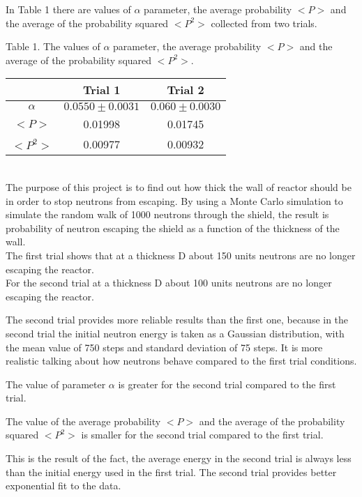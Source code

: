 \documentclass[12pt]{article}
\begin{document}
In Table 1 there are values of $\alpha$ parameter, the average probability $<P>$ and the average of the probability squared $<P^2>$ collected from two trials.


\begin{center}
Table 1. The values of $\alpha$ parameter, the average probability $<P>$ and the average of the probability squared $<P^2>$.

\begin{tabular}{|c|c|c|}
\hline
            & Trial 1 & Trial 2 \\
\hline
$\alpha$   & $0.0550 \pm 0.0031 $ &  $0.060 \pm 0.0030 $   \\
\hline
$<P>$   & 0.01998  &  0.01745   \\
\hline
$<P^2>$   & 0.00977   &  0.00932   \\
\hline
\end{tabular}\vskip 0.2in
\end{center}


\vskip0.1in
\\

The purpose of this project is to find out how thick the wall of reactor should be in order to stop neutrons from escaping.
By using a Monte Carlo simulation to simulate the random walk of 1000 neutrons through the shield, the result is probability of neutron escaping the shield as a function of the thickness of the wall.\\

The first trial shows that at a thickness D about 150 units neutrons are no longer escaping the reactor. \\
For the second trial at a thickness D about 100 units neutrons are no longer escaping the reactor.

The second trial provides more reliable results than the first one, because in the second trial the initial neutron energy is taken as a Gaussian distribution, with the mean value of 750 steps and standard deviation of 75 steps. It is more realistic talking about how neutrons behave compared to the first trial conditions.

The value of parameter $\alpha$ is greater for the second trial compared to the first trial.

The value of the average probability $<P>$ and the average of the probability squared $<P^2>$ is smaller for the second trial compared to the first trial.

This is the result of the fact, the average energy in the second trial is always less than the initial energy used in the first trial. 
The second trial provides better exponential fit to the data. 

\end{document}
